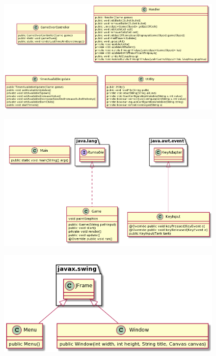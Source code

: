 \documentclass{article}
\begin{document}

\begin{figure} [hbt!]
    \includegraphics[width=15cm,center]{images/pakiet_game.png}
\end{figure}

\begin{figure} [hbt!]
    \includegraphics[width=13cm,center]{images/pakiet_game_cd.png}
\end{figure}

\begin{figure} [hbt!]
    \includegraphics[width=12cm,center]{images/pakiet_window.png}
\end{figure}
\end{document}
